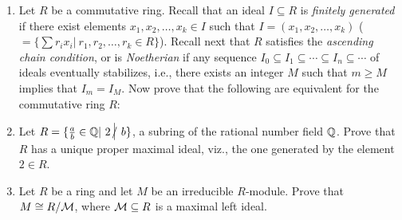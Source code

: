 \documentclass{article}
\begin{document}
\begin{Large}
\begin{enumerate}
\item Let $R$ be a commutative ring. Recall that an ideal $I\subseteq R$ is
{\em finitely generated} if there exist elements $x_1,x_2,\ldots ,x_k\in I$
such that $I=(x_1,x_2,\ldots ,x_k)$ ($=\{\sum r_ix_i|\ r_1,r_2,\ldots ,r_k\in
R\}$). Recall next that $R$ satisfies the {\em ascending chain condition},
or is {\em Noetherian} if any sequence $I_0\subseteq I_1\subseteq\cdots
\subseteq I_n\subseteq\cdots $ 
of ideals eventually stabilizes, i.e., there exists
an integer $M$ such that $m\geq M$ implies that $I_m=I_M$.
Now prove that the following are equivalent for the commutative
ring $R$:
\item Let $R=\{\frac{a}{b}\in {\Bbb Q}|\ 2\notdivs b\}$, a subring of
the rational number field ${\Bbb Q}$. Prove that $R$ has a unique
proper maximal ideal, viz., the one generated by the element $2\in R$.


\item Let $R$ be a ring and let $M$ be an irreducible $R$-module. Prove
that $M\cong R/{\cal M}$, where ${\cal M}\subseteq R$ is a maximal left ideal.




\end{enumerate}
\end{Large}
\end{document}
